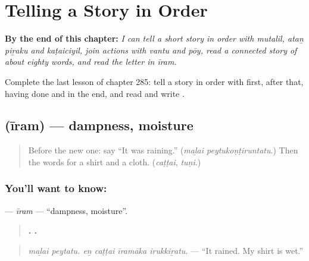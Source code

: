
\chapter{Telling a Story in Order}
\label{ch:ta-telling-a-story-in-order}

\begin{chapteropening}
\textbf{By the end of this chapter:} \emph{I can tell a short story in order with mutalil, ataṉ piṟaku and kaṭaiciyil, join actions with vantu and pōy, read a connected story of about eighty words, and read the letter  in īram.}

Complete the last lesson of chapter 285: tell a story in order with first, after that, having done and in the end, and read and write .
\end{chapteropening}

\section[\texorpdfstring{\ta{ஈரம்} (īram)}{ஈரம் (īram)}]{ (īram) — dampness, moisture}

\label{lesson:TA-C285-iram}



\begin{quote}
Before the new one: say \textquotedblleft{}It was raining.\textquotedblright{} (\emph{maḻai peytukoṇṭiruntatu}.) Then the words for a shirt and a cloth. (\emph{caṭṭai}, \emph{tuṇi}.)
\end{quote}

\subsection*{You'll want to know: }
\textbf{} — \emph{īram} — \textquotedblleft{}dampness, moisture\textquotedblright{}.

\begin{quote}
\textbf{ .    .}
\end{quote}

\begin{quote}
\emph{maḻai peytatu. eṉ caṭṭai īramāka irukkiṟatu.} — \textquotedblleft{}It rained. My shirt is wet.\textquotedblright{}
\end{quote}

